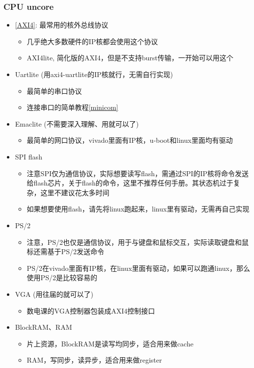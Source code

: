 \documentclass[lang=cn,11pt,a4paper]{elegantpaper}
\begin{document}
\subsubsection{CPU uncore}

\begin{itemize}
\item \href{run:../manuals/AXI4.pdf}{[AXI4]}: 最常用的核外总线协议
  \begin{itemize}
  \item 几乎绝大多数硬件的IP核都会使用这个协议
  \item AXI4lite, 简化版的AXI4，但是不支持burst传输，一开始可以用这个
  \end{itemize}
\item Uartlite (用axi4-uartlite的IP核就行，无需自行实现)
  \begin{itemize}
  \item 最简单的串口协议
  \item 连接串口的简单教程\ref{minicom}
  \end{itemize}
\item Emaclite (不需要深入理解、用就可以了)
  \begin{itemize}
  \item 最简单的网口协议，vivado里面有IP核，u-boot和linux里面均有驱动
  \end{itemize}
\item SPI flash
  \begin{itemize}
  \item 注意SPI仅为通信协议，实际想要读写flash，需通过SPI的IP核将命令发送给flash芯片，关于flash的命令，这里不推荐任何手册。其状态机过于复杂，这里不建议花太多时间
  \item 如果想要使用flash，请先将linux跑起来，linux里有驱动，无需再自己实现
  \end{itemize}
\item PS/2
  \begin{itemize}
  \item 注意，PS/2也仅是通信协议，用于与键盘和鼠标交互，实际读取键盘和鼠标还需基于PS/2发送命令
  \item PS/2在vivado里面有IP核，在linux里面有驱动，如果可以跑通linux，那么使用PS/2是比较容易的
  \end{itemize}
\item VGA (用往届的就可以了)
  \begin{itemize}
  \item 数电课的VGA控制器包装成AXI4控制接口
  \end{itemize}
\item BlockRAM、RAM
  \begin{itemize}
  \item 片上资源，BlockRAM是读写均同步，适合用来做cache
  \item RAM，写同步，读异步，适合用来做register
  \end{itemize}
\end{itemize}
\end{document}
